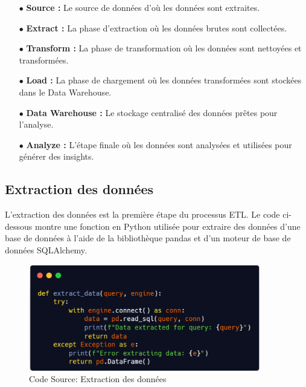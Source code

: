 \begin{itemize}



    \item[$\bullet$] \textbf {Source  :} Le source de données d'où les données sont extraites. \\
    \item[$\bullet$] \textbf {Extract :} La phase d'extraction où les données brutes sont collectées.\\
    \item[$\bullet$] \textbf {Transform :} La phase de transformation où les données sont nettoyées et transformées.\\
    \item[$\bullet$] \textbf {Load :} La phase de chargement où les données transformées sont stockées dans le Data Warehouse.\\
    \item[$\bullet$] \textbf {Data Warehouse :} Le stockage centralisé des données prêtes pour l'analyse.\\
    \item[$\bullet$] \textbf {Analyze :} L'étape finale où les données sont analysées et utilisées pour générer des insights.\\

\end{itemize}

\newpage
\subsection{Extraction des données}
L'extraction des données est la première étape du processus ETL. Le code ci-dessous montre une fonction en Python utilisée pour extraire des données d'une base de données à l'aide de la bibliothèque pandas et d'un moteur de base de données SQLAlchemy.

\begin{figure}[h!]

    \centering
    \includegraphics[width=0.9\textwidth]{chap6.images/E.png}
    \caption{ Code Source: Extraction des données}

\end{figure}

